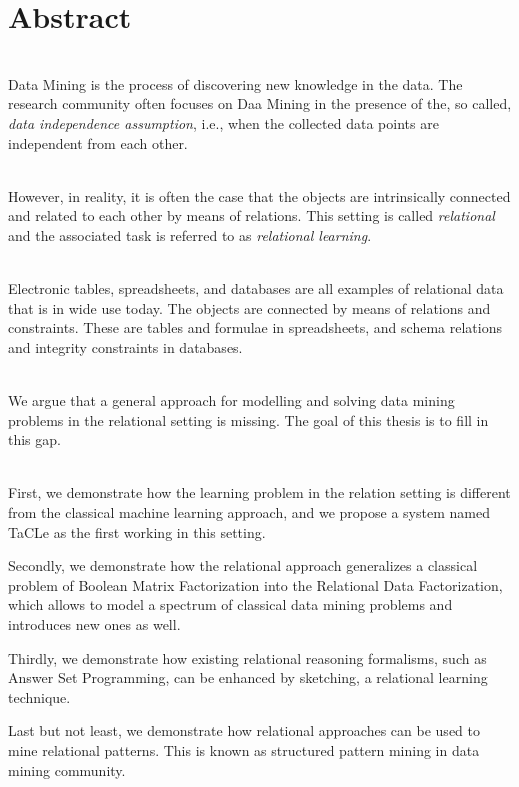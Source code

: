 \chapter{Abstract} \label{ch:abstract}
\\
Data Mining is the process of discovering new knowledge in the data.
The research community often focuses on Daa Mining 
in the presence of the, so called, \textit{data independence assumption}, i.e.,
when the collected data points are independent from each other.

\\
However, in reality, it is often the case that the objects are 
intrinsically connected and related to each other by means of relations. 
This setting is called \textit{relational} and the associated task 
is referred to as \textit{relational learning}.

\\
Electronic tables, spreadsheets, and databases are all examples of
relational data that is in wide use today. The objects are connected
by means of relations and constraints. These are
tables and formulae in spreadsheets, and  schema relations and integrity
constraints in databases.

\\
We argue that a general approach for modelling and solving data mining  
problems in the relational setting is missing. The goal of this thesis
is to fill in this gap.


\\
First, we demonstrate how the learning problem in the relation
setting is different from the classical machine learning approach, and we
propose a system named TaCLe as the first working in this setting.

Secondly, we demonstrate how the relational approach generalizes a
classical problem of Boolean Matrix Factorization into the Relational
Data Factorization, which allows to model a spectrum of classical data
mining problems and introduces new ones as well.

Thirdly, we demonstrate how existing relational reasoning formalisms,
such as Answer Set Programming, can be enhanced by sketching, a relational learning
technique.

Last but not least, we demonstrate how relational approaches can be used
to mine relational patterns. This is known as structured pattern mining in
data mining community.


\cleardoublepage

